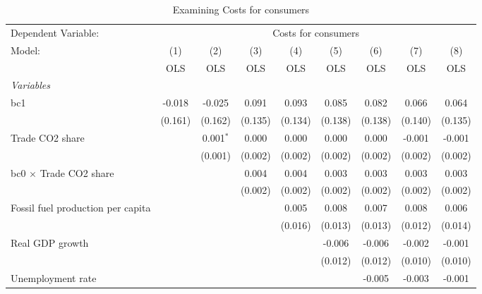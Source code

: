 
\begin{table}[htbp]
   \caption{Examining Costs for consumers}
   \centering
   \begin{tabular}{lcccccccc}
      \toprule
      Dependent Variable: & \multicolumn{8}{c}{Costs for consumers}\\
      Model:                                  & (1)     & (2)         & (3)     & (4)     & (5)     & (6)     & (7)     & (8)\\  
                                              &  OLS    & OLS         & OLS     & OLS     & OLS     & OLS     & OLS     & OLS\\  
      \midrule
      \emph{Variables}\\
      bc1                                     & -0.018  & -0.025      & 0.091   & 0.093   & 0.085   & 0.082   & 0.066   & 0.064\\   
                                              & (0.161) & (0.162)     & (0.135) & (0.134) & (0.138) & (0.138) & (0.140) & (0.135)\\   
      Trade CO2 share                         &         & 0.001$^{*}$ & 0.000   & 0.000   & 0.000   & 0.000   & -0.001  & -0.001\\   
                                              &         & (0.001)     & (0.002) & (0.002) & (0.002) & (0.002) & (0.002) & (0.002)\\   
      bc0 $\times$ Trade CO2 share            &         &             & 0.004   & 0.004   & 0.003   & 0.003   & 0.003   & 0.003\\   
                                              &         &             & (0.002) & (0.002) & (0.002) & (0.002) & (0.002) & (0.002)\\   
      Fossil fuel production per capita       &         &             &         & 0.005   & 0.008   & 0.007   & 0.008   & 0.006\\   
                                              &         &             &         & (0.016) & (0.013) & (0.013) & (0.012) & (0.014)\\   
      Real GDP growth                         &         &             &         &         & -0.006  & -0.006  & -0.002  & -0.001\\   
                                              &         &             &         &         & (0.012) & (0.012) & (0.010) & (0.010)\\   
      Unemployment rate                       &         &             &         &         &         & -0.005  & -0.003  & -0.001\\   

\end{tabular}
\end{table}
